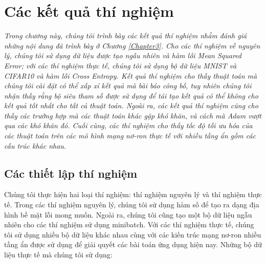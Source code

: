 \chapter{Các kết quả thí nghiệm}
\label{Chapter4}

\textit{Trong chương này, chúng tôi trình bày các kết quả thí nghiệm nhằm đánh giá những nội dung đã trình bày ở Chương \ref{Chapter3}. Cho các thí nghiệm về nguyên lý, chúng tôi sử dụng dữ liệu được tạo ngẫu nhiên và hàm lỗi Mean Squared Error; với các thí nghiệm thực tế, chúng tôi sử dụng bộ dữ liệu MNIST và CIFAR10 và hàm lỗi Cross Entropy. Kết quả thí nghiệm cho thấy thuật toán mà chúng tôi cài đặt có thể xấp xỉ kết quả mà bài báo công bố, tuy nhiên chúng tôi nhận thấy rằng bộ siêu tham số được sử dụng để tái tạo kết quả có thể không cho kết quả tốt nhất cho tất cả thuật toán. Ngoài ra, các kết quả thí nghiệm cũng cho thấy các trường hợp mà các thuật toán khác gặp khó khăn, và cách mà Adam vượt qua các khó khăn đó. Cuối cùng, các thí nghiệm cho thấy tốc độ tối ưu hóa của các thuật toán trên các mô hình mạng nơ-ron thực tế với nhiều tầng ẩn gồm các cấu trúc khác nhau.}

\section{Các thiết lập thí nghiệm}

Chúng tôi thực hiện hai loại thí nghiệm: thí nghiệm nguyên lý và thí nghiệm thực tế. Trong các thí nghiệm nguyên lý, chúng tôi sử dụng hàm số để tạo ra dạng địa hình bề mặt lỗi mong muốn. Ngoài ra, chúng tôi cũng tạo một bộ dữ liệu ngẫu nhiên cho các thí nghiệm sử dụng minibatch. Với các thí nghiệm thực tế, chúng tôi sử dụng nhiều bộ dữ liệu khác nhau cùng với các kiến trúc mạng nơ-ron nhiều tầng ẩn được sử dụng để giải quyết các bài toán ứng dụng hiện nay. Những bộ dữ liệu thực tế mà chúng tôi sử dụng:

